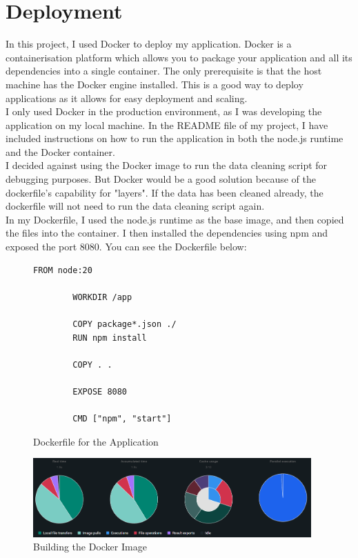 \documentclass{report}
\begin{document}
\section{Deployment}
In this project, I used Docker to deploy my application. Docker is a containerisation platform which allows you to package your application and all its dependencies into a single container. The only prerequisite is that the host machine has the Docker engine installed. This is a good way to deploy applications as it allows for easy deployment and scaling.\\

I only used Docker in the production environment, as I was developing the application on my local machine. In the README file of my project, I have included instructions on how to run the application in both the node.js runtime and the Docker container.\\

I decided against using the Docker image to run the data cleaning script for debugging purposes. But Docker would be a good solution because of the dockerfile's capability for "layers". If the data has been cleaned already, the dockerfile will not need to run the data cleaning script again. \\

In my Dockerfile, I used the node.js runtime as the base image, and then copied the files into the container. I then installed the dependencies using npm and exposed the port 8080. You can see the Dockerfile below:

\begin{figure}[h]
    \centering
    \begin{lstlisting}[language=Docker]
        FROM node:20

        WORKDIR /app

        COPY package*.json ./
        RUN npm install

        COPY . .

        EXPOSE 8080

        CMD ["npm", "start"]
    \end{lstlisting}
    \caption{Dockerfile for the Application}
    \label{fig:dockerfile}
\end{figure}
\begin{center}
    \begin{figure}[h]
        \centering
        \includegraphics[width=0.95\textwidth]{Images/docker-build.png}
        \caption{Building the Docker Image}
        \label{fig:docker-build}
    \end{figure}
\end{center}
\end{document}
